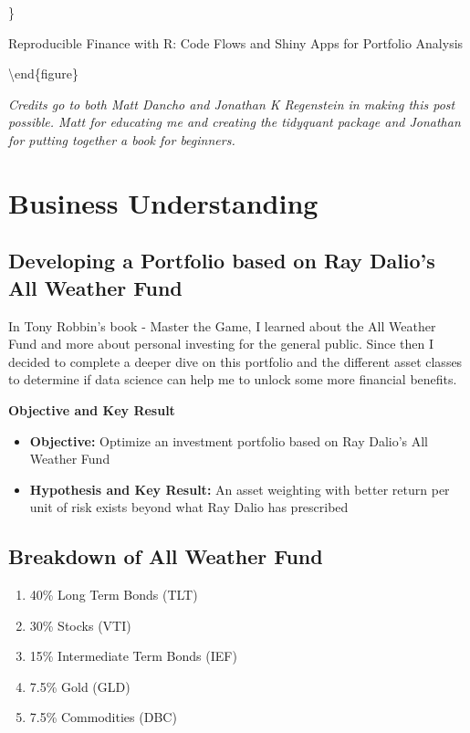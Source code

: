 \documentclass[
]{article}
\providecommand{\tightlist}{%
  \setlength{\itemsep}{0pt}\setlength{\parskip}{0pt}}
\begin{document}
\}

\caption{Reproducible Finance with R: Code Flows and Shiny Apps for Portfolio Analysis}\label{fig:unnamed-chunk-4}

\textbackslash end\{figure\}

\emph{Credits go to both Matt Dancho and Jonathan K Regenstein in making
this post possible. Matt for educating me and creating the tidyquant
package and Jonathan for putting together a book for beginners.}

\hypertarget{business-understanding}{%
\section{Business Understanding}\label{business-understanding}}

\hypertarget{developing-a-portfolio-based-on-ray-dalios-all-weather-fund}{%
\subsection{Developing a Portfolio based on Ray Dalio's All Weather
Fund}\label{developing-a-portfolio-based-on-ray-dalios-all-weather-fund}}

In Tony Robbin's book - Master the Game, I learned about the All Weather
Fund and more about personal investing for the general public. Since
then I decided to complete a deeper dive on this portfolio and the
different asset classes to determine if data science can help me to
unlock some more financial benefits.

\textbf{Objective and Key Result}

\begin{itemize}
\item
  \textbf{Objective:} Optimize an investment portfolio based on Ray
  Dalio's All Weather Fund
\item
  \textbf{Hypothesis and Key Result:} An asset weighting with better
  return per unit of risk exists beyond what Ray Dalio has prescribed
\end{itemize}

\hypertarget{breakdown-of-all-weather-fund}{%
\subsection{Breakdown of All Weather
Fund}\label{breakdown-of-all-weather-fund}}

\begin{enumerate}
\def\labelenumi{\arabic{enumi}.}
\tightlist
\item
  40\% Long Term Bonds (TLT)
\item
  30\% Stocks (VTI)
\item
  15\% Intermediate Term Bonds (IEF)
\item
  7.5\% Gold (GLD)
\item
  7.5\% Commodities (DBC)
\end{enumerate}
\end{document}
